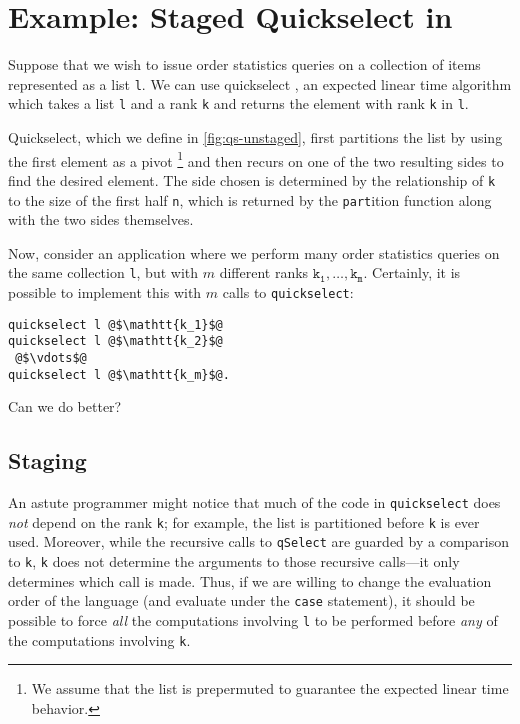 
\section {Example: Staged Quickselect in \texorpdfstring{\lang}{λ12}}
\label{sec:example}

\begin{abstrsyn}



Suppose that we wish to issue order statistics queries on a collection of items
represented as a list \texttt{l}. We can use quickselect \cite{Hoare:1961}, an
expected linear time algorithm which takes a list \texttt{l} and a rank
\texttt{k} and returns the element with rank \texttt{k} in \texttt{l}.

Quickselect, which we define in \ref{fig:qs-unstaged}, first partitions the list
by using the first element as a pivot%
\footnote{We assume that the list is prepermuted to guarantee the expected
linear time behavior.}
and then recurs on one of the two resulting sides to find the desired element.
The side chosen is determined by the relationship of \texttt{k} to the size of
the first half \texttt{n}, which is returned by the \texttt{part}ition function
along with the two sides themselves.

Now, consider an application where we perform many order statistics queries on
the same collection \texttt{l}, but with $m$ different ranks
$\mathtt{k_1},\dots,\mathtt{k_m}$.
Certainly, it is possible to implement this with $m$ calls to
\texttt{quickselect}:
%
\begin{lstlisting}
quickselect l @$\mathtt{k_1}$@
quickselect l @$\mathtt{k_2}$@
 @$\vdots$@ 
quickselect l @$\mathtt{k_m}$@.
\end{lstlisting}
%
Can we do better?

\subsection{Staging}

An astute programmer might notice that much of the code in \texttt{quickselect}
does \emph{not} depend on the rank \texttt{k}; for example, the list is
partitioned before \texttt{k} is ever used. Moreover, while the recursive calls
to \texttt{qSelect} are guarded by a comparison to \texttt{k}, \texttt{k} does
not determine the arguments to those recursive calls---it only determines which
call is made. Thus, if we are willing to change the evaluation order of the
language (and evaluate under the \texttt{case} statement), it should be possible
to force \emph{all} the computations involving \texttt{l} to be performed before
\emph{any} of the computations involving \texttt{k}.


\end{abstrsyn}
